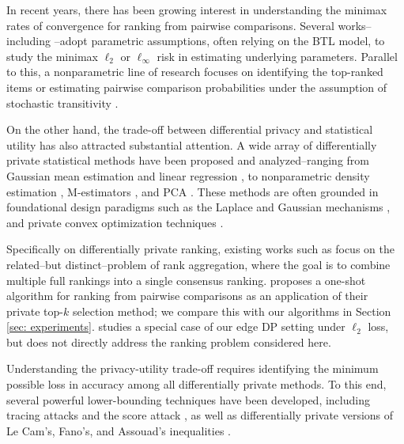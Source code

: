\documentclass[letterpaper,12pt]{article}
\numberwithin{equation}{section}
\theoremstyle{plain}
\numberwithin{Theorem}{section}
\numberwithin{corollary}{section}
\numberwithin{proposition}{section}
\numberwithin{Lemma}{section}
{
	\theoremstyle{definition}
	\newtheorem{Definition}{Definition}
	\newtheorem{example}{Example}
	\numberwithin{example}{section}
	\newtheorem{fact}{Fact}
	\numberwithin{fact}{section}
	\newtheorem{remark}{Remark}
}
\newcommand{\1}{\mathbbm{1}}
\begin{document}
In recent years, there has been growing interest in understanding the minimax rates of convergence for ranking from pairwise comparisons. Several works--including \cite{wauthier2013efficient, rajkumar2014statistical, negahban2017rank, shah2015estimation, chen2015spectral, chen2019spectral}--adopt parametric assumptions, often relying on the BTL model, to study the minimax $\ell_2$ or $\ell_\infty$  risk in estimating underlying parameters. Parallel to this, a nonparametric line of research focuses on identifying the top-ranked items \cite{shah2017simple, chen2017competitive} or estimating pairwise comparison probabilities under the assumption of stochastic transitivity \cite{shah2016stochastically, shah2019feeling, pananjady2020worst}.

On the other hand, the trade-off between differential privacy and statistical utility has also attracted substantial attention. A wide array of differentially private statistical methods have been proposed and analyzed--ranging from Gaussian mean estimation and linear regression \cite{cai2021cost}, to nonparametric density estimation \cite{wasserman2010statistical}, M-estimators \cite{lei2011differentially}, and PCA \cite{dwork2014analyze}. These methods are often grounded in foundational design paradigms such as the Laplace and Gaussian mechanisms \cite{dwork2006calibrating, dwork2014algorithmic}, and private convex optimization techniques \cite{chaudhuri2009privacy, chaudhuri2011differentially, bassily2014private, kifer2012private, bassily2019private}.

Specifically on differentially private ranking, existing works such as \cite{shang2014application, hay2017differentially, yan2020private, song2022distributed} focus on the related--but distinct--problem of rank aggregation, where the goal is to combine multiple full rankings into a single consensus ranking. \cite{qiao2021oneshot} proposes a one-shot algorithm for ranking from pairwise comparisons as an application of their private top-$k$ selection method; we compare this with our algorithms in Section \ref{sec: experiments}. \cite{cai2023score} studies a special case of our edge DP setting under $\ell_2$  loss, but does not directly address the ranking problem considered here.

Understanding the privacy-utility trade-off requires identifying the minimum possible loss in accuracy among all differentially private methods. To this end, several powerful lower-bounding techniques have been developed, including tracing attacks \cite{bun2014fingerprinting, dwork2015robust, steinke2017between, steinke2017tight, kamath2018privately, cai2021cost} and the score attack \cite{cai2020cost, cai2023score}, as well as differentially private versions of Le Cam's, Fano's, and Assouad's inequalities \cite{barber2014privacy, karwa2017finite, canonne2018structure, acharya2018differentially, acharya2021differentially}.
\end{document}
